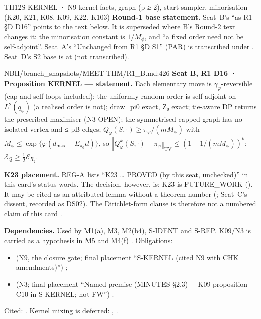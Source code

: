 \begin{card}{TH12}{S-KERNEL · N9 kernel facts, graph (p ≥ 2), start sampler, minorisation (K20, K21, K08, K09, K22, K103)}
\textbf{Round-1 base statement.} Seat~B's ``as R1 §D D16'' points to the text below. It is superseded where B's Round-2 text changes it: the minorisation constant is $1/M_\phi$, and ``a fixed order need not be self-adjoint''. Seat~A's ``Unchanged from R1 §D S1'' (PAR) is transcribed under . Seat~D's S2 base is at  (not transcribed).
\begin{stmt}{NBH/branch_snapshots/MEET-THM/R1_B.md:426}
\textbf{Seat B, R1 D16 · Proposition KERNEL — statement.} Each elementary move is $γ_φ$-reversible (cap and self-loops included); the uniformly random order is self-adjoint on $L^2(q_φ)$ (a realised order is not); draw\_pi0 exact, Z̄₀ exact; tie-aware DP returns the prescribed maximiser (N3 OPEN); the symmetrised capped graph has no isolated vertex and ≤ pB edges; $Q_φ(S,\cdot) ≥ π_φ/(mM_φ)$ with $M_φ ≤ \exp\{φ(d_{\max} − E_{π_0}d)\}$, so $‖Q_φ^k(S,\cdot) − π_φ‖_{\mathrm{TV}} ≤ (1 − 1/(mM_φ))^k$; $ℰ_Q ≥ \tfrac12ℰ_{R_2}$.
\end{stmt}

\textbf{K23 placement.} REG-A lists ``K23 \ldots{} PROVED (by this seat, unchecked)'' in this card's status words. The decision, however, is: K23 is FUTURE\_WORK (). It may be cited as an attributed lemma without a theorem number (; Seat~C's dissent, recorded as DS02). The Dirichlet-form clause is therefore not a numbered claim of this card  .

\textbf{Dependencies.} Used by M1(a), M3, M2(b4), S-IDENT and S-REP. K09/N3 is carried as a hypothesis in M5 and M4(f) . Obligations:
\begin{itemize}
\item {} (N9, the closure gate; final placement ``S-KERNEL (cited N9 with CHK amendments)'') ;
\item {} (N3; final placement ``Named premise (MINUTES §2.3) + K09 proposition C10 in S-KERNEL; not FW'') .
\end{itemize}
Cited: . Kernel mixing is deferred: , .


\end{card}
